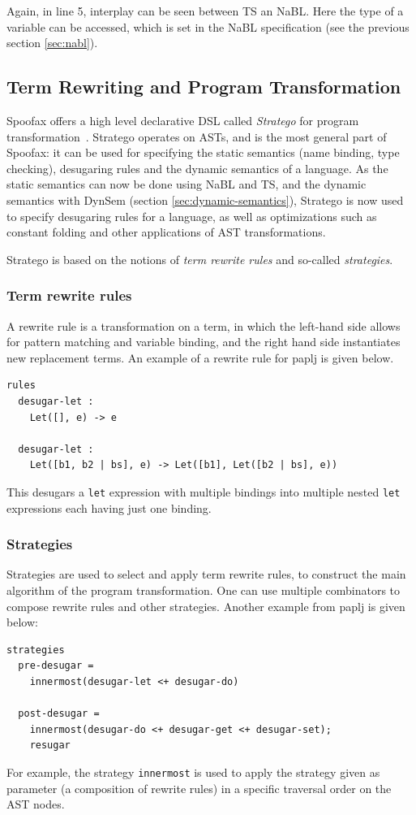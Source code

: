 Again, in line 5, interplay can be seen between TS an NaBL. Here the
type of a variable can be accessed, which is set in the NaBL
specification (see the previous section \ref{sec:nabl}).
\subsection{Term Rewriting and Program Transformation}
\label{sec:term-rewrite}
Spoofax offers a high level declarative DSL called \emph{Stratego} for
program transformation~\cite{Visser01}. Stratego operates on ASTs,
and is the most general part of Spoofax: it can be used for specifying
the static semantics (name binding, type checking), desugaring rules
and the dynamic semantics of a language. As the static semantics can
now be done using NaBL and TS, and the dynamic semantics with DynSem
(section \ref{sec:dynamic-semantics}), Stratego is now used to specify
desugaring rules for a language, as well as optimizations such as
constant folding and other applications of AST transformations.

Stratego is based on the notions of \emph{term rewrite rules} and so-called
\emph{strategies}.
\subsubsection{Term rewrite rules}
\label{sec:orgheadline4}
A rewrite rule is a transformation on a term, in which the left-hand
side allows for pattern matching and variable binding, and the right
hand side instantiates new replacement terms. An example of a rewrite
rule for paplj is given below.
\lstset{language=stratego,numbers=left}
\begin{lstlisting}
rules
  desugar-let :
  	Let([], e) -> e

  desugar-let :
  	Let([b1, b2 | bs], e) -> Let([b1], Let([b2 | bs], e))
\end{lstlisting}
This desugars a \texttt{let} expression with multiple bindings into multiple
nested \texttt{let} expressions each having just one binding.
\subsubsection{Strategies}
\label{sec:orgheadline5}
Strategies are used to select and apply term rewrite rules, to
construct the main algorithm of the program transformation. One can
use multiple combinators to compose rewrite rules and other
strategies. Another example from paplj is given below:
\lstset{language=stratego,numbers=left}
\begin{lstlisting}
strategies
  pre-desugar =
    innermost(desugar-let <+ desugar-do)

  post-desugar =
    innermost(desugar-do <+ desugar-get <+ desugar-set);
    resugar
\end{lstlisting}
For example, the strategy \texttt{innermost} is used to apply the strategy
given as parameter (a composition of rewrite rules) in a specific
traversal order on the AST nodes.

